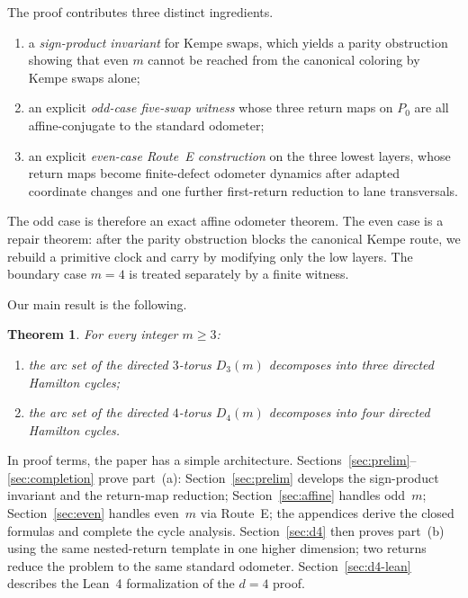 \documentclass[11pt]{article}
\newtheorem{theorem}{Theorem}
\begin{document}
The proof contributes three distinct ingredients.
\begin{enumerate}[label=\textup{(\roman*)},leftmargin=2.5em]
\item a \emph{sign-product invariant} for Kempe swaps, which yields a parity obstruction showing that even $m$ cannot be reached from the canonical coloring by Kempe swaps alone;
\item an explicit \emph{odd-case five-swap witness} whose three return maps on $P_0$ are all affine-conjugate to the standard odometer;
\item an explicit \emph{even-case Route~E construction} on the three lowest layers, whose return maps become finite-defect odometer dynamics after adapted coordinate changes and one further first-return reduction to lane transversals.
\end{enumerate}

The odd case is therefore an exact affine odometer theorem.
The even case is a repair theorem: after the parity obstruction blocks the canonical Kempe route, we rebuild a primitive clock and carry by modifying only the low layers.
The boundary case $m=4$ is treated separately by a finite witness.

Our main result is the following.


\begin{theorem}\label{thm:main-all}
For every integer $m\ge 3$:
\begin{enumerate}[label=\textup{(\alph*)}]
\item the arc set of the directed $3$-torus $D_3(m)$ decomposes into three directed Hamilton cycles;
\item the arc set of the directed $4$-torus $D_4(m)$ decomposes into four directed Hamilton cycles.
\end{enumerate}
\end{theorem}

In proof terms, the paper has a simple architecture.
Sections~\ref{sec:prelim}--\ref{sec:completion} prove part~(a): Section~\ref{sec:prelim} develops the sign-product invariant and the return-map reduction; Section~\ref{sec:affine} handles odd~$m$; Section~\ref{sec:even} handles even~$m$ via Route~E; the appendices derive the closed formulas and complete the cycle analysis.
Section~\ref{sec:d4} then proves part~(b) using the same nested-return template in one higher dimension; two returns reduce the problem to the same standard odometer.
Section~\ref{sec:d4-lean} describes the Lean~4 formalization of the $d=4$ proof.
\end{document}
